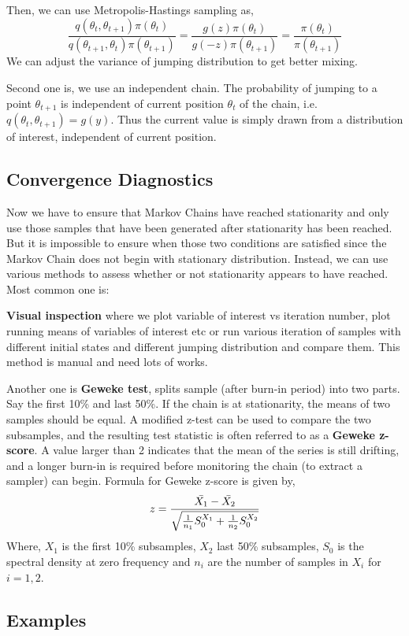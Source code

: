 Then, we can use Metropolis-Hastings sampling as,
\[
	\frac{q(\theta_t,\theta_{t+1})\pi(\theta_t)}{q(\theta_{t+1},\theta_{t})\pi(\theta_{t+1})}  = \frac{g(z)\pi(\theta_t)}{g(-z)\pi(\theta_{t+1})} = \frac{\pi(\theta_t)}{\pi(\theta_{t+1})}
\]
We can adjust the variance of jumping distribution to get better mixing.

Second one is, we use an independent chain. The probability of jumping to a point $ \theta_{t+1} $ is independent of current position $ \theta_t $ of the chain, i.e. $ q(\theta_t,\theta_{t+1}) = g(y) $. Thus the current value is simply drawn from a distribution of interest, independent of current position.

\subsection{Convergence Diagnostics}
Now we have to ensure that Markov Chains have reached stationarity and only use those samples that have been generated after stationarity has been reached. But it is impossible to ensure when those two conditions are satisfied since the Markov Chain does not begin with stationary distribution. Instead, we can use various methods to assess whether or not stationarity appears to have reached. Most common one is:

\textbf{Visual inspection} where we plot variable of interest vs iteration number, plot running means of variables of interest etc or run various iteration of samples with different initial states and different jumping distribution and compare them. This method is manual and need lots of works.

Another one is \textbf{Geweke test}, splits sample (after burn-in period) into two parts.
Say the first 10\% and last 50\%. If the chain is at stationarity, the means of two samples should be equal. A modified z-test can be used to compare the two subsamples,
and the resulting test statistic is often referred to as a \textbf{Geweke z-score}.
A value larger than 2 indicates that the mean of
the series is still drifting, and a longer burn-in is required before monitoring the
chain (to extract a sampler) can begin. Formula for Geweke z-score is given by,
\[
	z = \frac{\Bar{X_1} - \Bar{X_2}}{\sqrt{ \frac{ 1 }{ n_1 }S^{X_1}_0 + \frac{ 1 }{ n_2 }S^{X_2}_0 }}
\]
Where, $ X_1 $ is the first 10\% subsamples, $ X_2 $ last 50\% subsamples, $ S_0 $ is the spectral density at zero frequency and $ n_i $ are the number of samples in $ X_i $ for $ i = 1,2 $.

\subsection{Examples}

